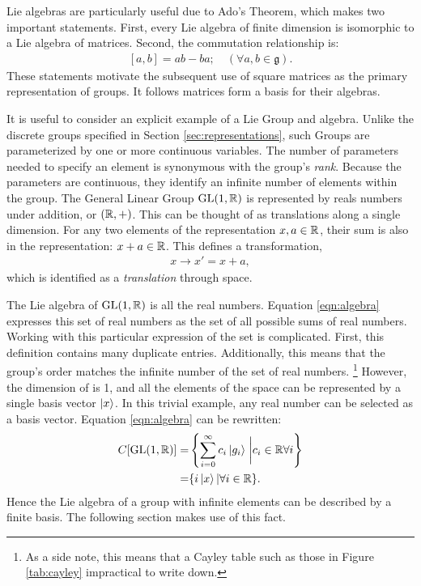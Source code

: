 Lie algebras are particularly useful due to Ado's Theorem, which makes two important statements. First, every Lie algebra of finite dimension is isomorphic to a Lie algebra of matrices. Second, the commutation relationship is:
\begin{equation}\begin{split}\label{eqn:commutator}
    [a,b]=ab-ba; \quad(\forall a,b\in\mathfrak{g}).
\end{split}\end{equation}
These statements motivate the subsequent use of square matrices as the primary representation of groups.
It follows matrices form a basis for their algebras.

It is useful to consider an explicit example of a Lie Group and algebra.
Unlike the discrete groups specified in Section \ref{sec:representations}, such Groups are parameterized by one or more continuous variables.
The number of parameters needed to specify an element is synonymous with the group's \emph{rank}.
Because the parameters are continuous, they identify an infinite number of elements within the group.
The General Linear Group $\text{GL}(1,\mathbb{R})$ is represented by reals numbers under addition, or $(\mathbb{R},+)$. \check
This can be thought of as translations along a single dimension. For any two elements of the representation $x,a\in\mathbb{R}$, their sum
is also in the representation: $x+a\in\mathbb{R}$. This defines a transformation,
\begin{equation}\begin{split}\label{eqn:simpleTransform}
    x\to x'=x+a,
\end{split}\end{equation} 
which is identified as a \emph{translation} through space.

The Lie algebra of $\text{GL}(1,\mathbb{R})$ is all the real numbers.
Equation \ref{eqn:algebra} expresses this set of real numbers as the set of all possible sums of real numbers.
Working with this particular expression of the set is complicated.
First, this definition contains many duplicate entries.
Additionally, this means that the group's order matches the infinite number of the set of real numbers.
\footnote{As a side note, this means that a Cayley table such as those in Figure \ref{tab:cayley} impractical to write down.}
However, the dimension of \reals is 1, and all the elements of the space can be represented by a single basis vector $\ket{x}$.
In this trivial example, any real number can be selected as a basis vector.
Equation \ref{eqn:algebra} can be rewritten:
\begin{equation}\begin{split}\label{eqn:algebra2}
    C[\text{GL}(1,\reals)]=&\left\{\sum_{i=0}^{\infty}c_i\ket{g_i}\eval c_i\in \reals \forall i\right\} \\
                          =&\{i\ket{x}|\forall i\in\reals\}.
\end{split}\end{equation}
Hence the Lie algebra of a group with infinite elements can be described by a finite basis.
The following section makes use of this fact.

